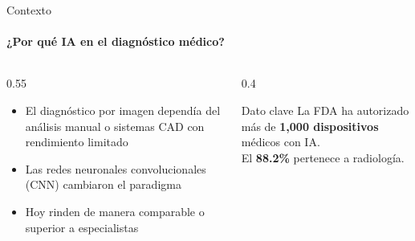 \begin{frame}{Contexto}
\framesubtitle{¿Por qué IA en el diagnóstico médico?}

\begin{columns}[T]
\begin{column}{0.55\textwidth}
\begin{itemize}
    \item El diagnóstico por imagen dependía del \alert{análisis manual} o sistemas CAD con rendimiento limitado
    \item Las \alert{redes neuronales convolucionales} (CNN) cambiaron el paradigma
    \item Hoy rinden de manera comparable o \alert{superior} a especialistas
\end{itemize}
\end{column}
\begin{column}{0.4\textwidth}
\begin{alertblock}{\faChartLine\; Dato clave}
La FDA ha autorizado más de \textbf{1,000 dispositivos} médicos con IA.\\[4pt]
El \textbf{88.2\%} pertenece a radiología.
\end{alertblock}
\end{column}
\end{columns}

\end{frame}
